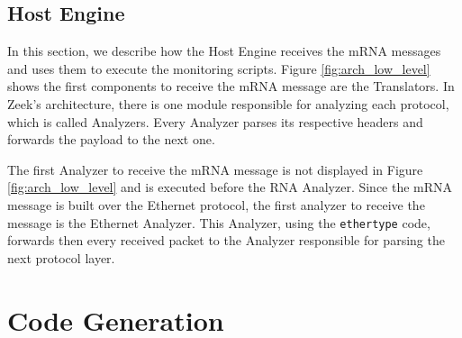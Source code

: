 \subsection{Host Engine}

In this section, we describe how the Host Engine receives the mRNA messages and uses them to execute the monitoring scripts. Figure \ref{fig:arch_low_level} shows the first components to receive the mRNA message are the Translators. In Zeek's architecture, there is one module responsible for analyzing each protocol, which is called Analyzers. Every Analyzer parses its respective headers and forwards the payload to the next one.

The first Analyzer to receive the mRNA message is not displayed in Figure \ref{fig:arch_low_level} and is executed before the RNA Analyzer. Since the mRNA message is built over the Ethernet protocol, the first analyzer to receive the message is the Ethernet Analyzer. This Analyzer, using the \texttt{ethertype} code, forwards then every received packet to the Analyzer responsible for parsing the next protocol layer.




\section{Code Generation}
